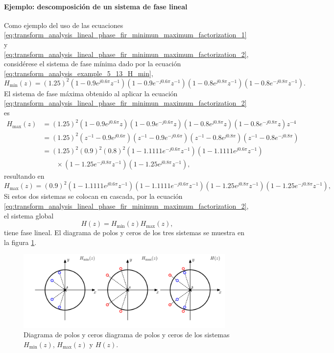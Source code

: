 \documentclass[a4paper]{report}
\begin{document}
\paragraph{Ejemplo: descomposición de un sistema de fase lineal} Como ejemplo del uso de las ecuaciones \ref{eq:transform_analysis_lineal_phase_fir_minimun_maximum_factorization_1} y \ref{eq:transform_analysis_lineal_phase_fir_minimun_maximum_factorization_2}, considérese el sistema de fase mínima dado por la ecuación \ref{eq:transform_analysis_example_5_13_H_min},
\[
 H_\textrm{min}(z)=(1.25)^2(1-0.9e^{j0.6\pi}z^{-1})(1-0.9e^{-j0.6\pi}z^{-1})(1-0.8e^{j0.8\pi}z^{-1})(1-0.8e^{-j0.8\pi}z^{-1}).
\]
El sistema de fase máxima obtenido al aplicar la ecuación \ref{eq:transform_analysis_lineal_phase_fir_minimun_maximum_factorization_2} es
\begin{align*}
  H_\textrm{max}(z)&=(1.25)^2(1-0.9e^{j0.6\pi}z)(1-0.9e^{-j0.6\pi}z)(1-0.8e^{j0.8\pi}z)(1-0.8e^{-j0.8\pi}z)z^{-4}\\
   &=(1.25)^2(z^{-1}-0.9e^{j0.6\pi})(z^{-1}-0.9e^{-j0.6\pi})(z^{-1}-0.8e^{j0.8\pi})(z^{-1}-0.8e^{-j0.8\pi})\\
   &=(1.25)^2(0.9)^2(0.8)^2(1-1.1111e^{-j0.6\pi}z^{-1})(1-1.1111e^{j0.6\pi}z^{-1})\\
   &\qquad\times(1-1.25e^{-j0.8\pi}z^{-1})(1-1.25e^{j0.8\pi}z^{-1}),
\end{align*}
resultando en
\[
 H_\textrm{max}(z)=(0.9)^2(1-1.1111e^{j0.6\pi}z^{-1})(1-1.1111e^{-j0.6\pi}z^{-1})(1-1.25e^{j0.8\pi}z^{-1})(1-1.25e^{-j0.8\pi}z^{-1}),
\]
Si estos dos sistemas se colocan en cascada, por la ecuación \ref{eq:transform_analysis_lineal_phase_fir_minimun_maximum_factorization_2}, el sistema global
\[
 H(z)=H_\textrm{min}(z)H_\textrm{max}(z),
\]
tiene fase lineal. El diagrama de polos y ceros de los tres sistemas se muestra en la figura \ref{fig:example_05_19_zero_pole_plot}.
\begin{figure}[!htb]
 \begin{center}
 \includegraphics[width=0.97\textwidth]{figuras/example_05_19_zero_pole_plot.pdf}
 \caption{\label{fig:example_05_19_zero_pole_plot} Diagrama de polos y ceros diagrama de polos y ceros de los sistemas \(H_\textrm{min}(z)\), \(H_\textrm{max}(z)\) y \(H(z)\).}
 \end{center}
\end{figure}
\end{document}
